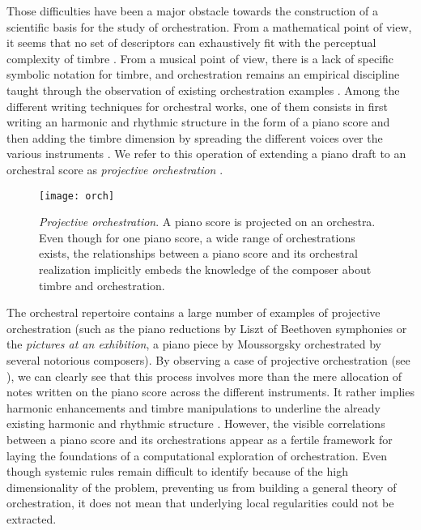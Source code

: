 \documentclass[letterpaper]{article}
\begin{document}
Those difficulties have been a major obstacle towards the construction of a scientific basis for the study of orchestration. From a mathematical point of view, it seems that no set of descriptors can exhaustively fit with the perceptual complexity of timbre \cite{peeters2011timbre}. From a musical point of view, there is a lack of specific symbolic notation for timbre, and orchestration remains an empirical discipline taught through the observation of existing orchestration examples \cite{piston-orch}. Among the different writing techniques for orchestral works, one of them consists in first writing an harmonic and rhythmic structure in the form of a piano score and then adding the timbre dimension by spreading the different voices over the various instruments \cite{piston-orch}. We refer to this operation of extending a piano draft to an orchestral score as \textit{projective orchestration} \cite{eslingthesis}.

\begin{figure}
\centering
\texttt{[image: orch]}
\caption{\textit{Projective orchestration}. A piano score is projected on an orchestra. Even though for one piano score, a wide range of orchestrations exists, the relationships between a piano score and its orchestral realization implicitly embeds the knowledge of the composer about timbre and orchestration.}
\label{fig:orch}
\end{figure}

The orchestral repertoire contains a large number of examples of projective orchestration (such as the piano reductions by Liszt of Beethoven symphonies or the \textit{pictures at an exhibition}, a piano piece by Moussorgsky orchestrated by several notorious composers). By observing a case of projective orchestration (see ), we can clearly see that this process involves more than the mere allocation of notes written on the piano score across the different instruments. It rather implies harmonic enhancements and timbre manipulations to underline the already existing harmonic and rhythmic structure \cite{mcadams2013timbre}. However, the visible correlations between a piano score and its orchestrations appear as a fertile framework for laying the foundations of a computational exploration of orchestration. Even though systemic rules remain difficult to identify because of the high dimensionality of the problem, preventing us from building a general theory of orchestration, it does not mean that underlying local regularities could not be extracted.
\end{document}

